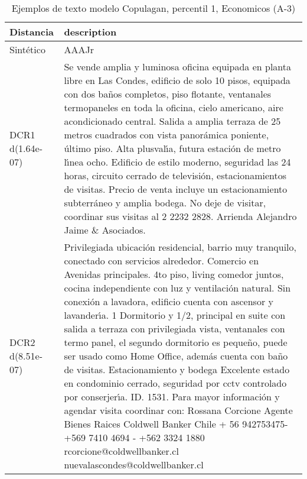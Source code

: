 \begin{table}[H]
\centering
\fontsize{10}{14}\selectfont
\caption{Ejemplos de texto modelo Copulagan, percentil 1, Economicos (A-3)}
\label{table-example-economicos-a-3-copulagan-1p-text}
\begin{tabular}{|l|m{35em}|}
\hline
\rowcolor[gray]{0.8}
Distancia & description \\
\hline Sintético & AAAJr \\
\hline DCR1 d(1.64e-07) & Se vende amplia y luminosa oficina equipada en planta libre en Las Condes, edificio de solo 10 pisos, equipada con dos ba\~nos completos, piso flotante, ventanales termopaneles en toda la oficina, cielo americano, aire acondicionado central. Salida a amplia terraza de 25 metros cuadrados con vista panor\'amica poniente, \'ultimo piso. Alta plusval{\'\i}a, futura estaci\'on de metro l{\'\i}nea ocho. Edificio de estilo moderno, seguridad las 24 horas, circuito cerrado de televisi\'on, estacionamientos de visitas. Precio de venta incluye un estacionamiento subterr\'aneo y amplia bodega. No deje de visitar, coordinar sus visitas al 2 2232 2828. Arrienda Alejandro Jaime \& Asociados. \\
\hline DCR2 d(8.51e-07) & Privilegiada ubicaci\'on residencial, barrio muy tranquilo, conectado con servicios alrededor.
Comercio en Avenidas principales.
4to piso, living comedor juntos, cocina independiente con luz y ventilaci\'on natural.
Sin conexi\'on a lavadora, edificio cuenta con ascensor y lavander{\'\i}a.
1 Dormitorio y 1/2, principal en suite con salida a terraza con privilegiada vista, ventanales con termo panel, el segundo dormitorio es peque\~no, puede ser usado como Home Office, adem\'as cuenta con ba\~no de visitas.
Estacionamiento y bodega
Excelente estado en condominio cerrado, seguridad por cctv controlado por conserjer{\'\i}a.
ID. 1531.
Para mayor informaci\'on y agendar visita coordinar con:
Rossana Corcione
Agente Bienes Raices 
Coldwell Banker Chile
+ 56 942753475- +569 7410 4694 - +562 3324 1880
rcorcione@coldwellbanker.cl
nuevalascondes@coldwellbanker.cl \\
\hline
\end{tabular}
\end{table}
